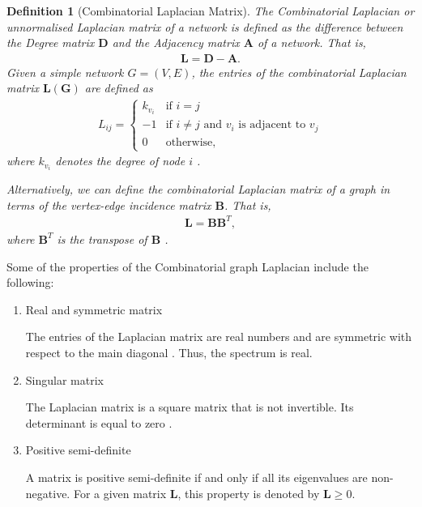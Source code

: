 \documentclass[10pt,a4paper]{article}
\newtheorem{defn}{Definition}
\begin{document}
\begin{defn}[Combinatorial Laplacian Matrix]
	The Combinatorial Laplacian or unnormalised Laplacian matrix of a network is defined as the difference between the Degree matrix $\mathbf{D}$ and the Adjacency matrix $\mathbf{A}$ of a network. That is,
	\begin{eqnarray}
	\mathbf{L} = \mathbf{D} - \mathbf{A}.
	\end{eqnarray}
	Given a simple network $G=(V,E)$, the entries of the combinatorial Laplacian matrix $\mathbf{L(G)}$  are defined as
	\begin{eqnarray}
	L_{ij} = \begin{cases} k_{v_i} &\mbox{if } i = j \\
	-1 &\mbox{if } i \neq j \text{ and } v_i \text{ is adjacent to } v_j \\
	0 & \text{otherwise},
	\end{cases}
	\end{eqnarray}
	where $k_{v_i}$  denotes the degree of node $i$ \citep{estrada2011structure}.
	
	Alternatively, we can define the combinatorial Laplacian matrix of a graph in terms of the vertex-edge incidence matrix $\mathbf{B}$. That is,
	\begin{eqnarray}
	\mathbf{L} =  \mathbf{B} \mathbf{B}^T,
	\label{lintermsb}
	\end{eqnarray}
	where $\mathbf{B}^T$ is the transpose of $\mathbf{B}$ \citep{estrada2011structure}.
\end{defn}

Some of the properties of the Combinatorial graph Laplacian  include the following:
\begin{enumerate}	
	\item{Real and symmetric matrix} 
	
	The entries of the Laplacian matrix are real numbers and are symmetric with respect to the main diagonal \citep{das2004laplacian}. Thus, the spectrum is real.
	\item{Singular matrix}
	
	The Laplacian matrix is a square matrix that is not invertible. Its determinant is equal to zero \citep{das2004laplacian}.
	\item{Positive semi-definite}
	
	A matrix is positive semi-definite if and only if all its eigenvalues are non-negative. For a given matrix $\mathbf{L}$, this property is denoted by $\mathbf{L}\geq 0$. 
	
\end{enumerate}
\end{document}
